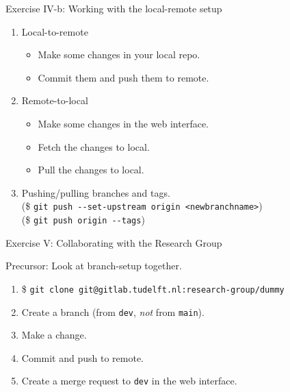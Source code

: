 \documentclass[aspectratio=169]{beamer}
\newcommand{\code}[1]{\texttt{\color{mygreen}#1}}
\begin{document}
\begin{frame}
  {Exercise IV-b: Working with the local-remote setup}

  \begin{enumerate}\itemsep0.2cm
    \item Local-to-remote
      \begin{itemize}
        \item Make some changes in your local repo.
        \item Commit them and push them to remote.
      \end{itemize}
    \item Remote-to-local
      \begin{itemize}
        \item Make some changes in the web interface.
        \item Fetch the changes to local.
        \item Pull the changes to local.
      \end{itemize}
    \item Pushing/pulling branches and tags.\\
      (\$ \code{git push -{}-set-upstream origin <newbranchname>})\\
      (\$ \code{git push origin -{}-tags})
  \end{enumerate}

\end{frame}


\begin{frame}
  {Exercise V: Collaborating with the Research Group}

  Precursor: Look at branch-setup together.

  \begin{enumerate}\itemsep.5cm
    \item \$ \code{git clone git@gitlab.tudelft.nl:research-group/dummy}
    \item Create a branch (from \code{dev}, \emph{not} from \code{main}).
    \item Make a change.
    \item Commit and push to remote.
    \item Create a merge request to \code{dev} in the web interface.
  \end{enumerate}

\end{frame}
\end{document}
